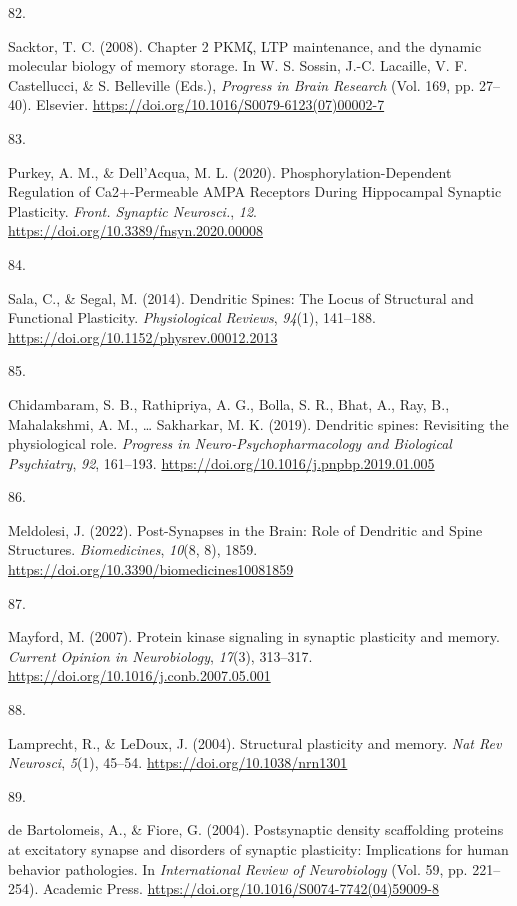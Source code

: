 \documentclass[
  11pt,
  letterpaper,
]{scrreprt}
\newlength{\cslhangindent}
\newlength{\csllabelwidth}
\newenvironment{CSLReferences}[2] %
 {\begin{list}{}{%
  \setlength{\itemindent}{0pt}
  \setlength{\leftmargin}{0pt}
  \setlength{\parsep}{0pt}
  \ifodd #1
   \setlength{\leftmargin}{\cslhangindent}
   \setlength{\itemindent}{-1\cslhangindent}
  \fi
  \setlength{\itemsep}{#2\baselineskip}}}
 {\end{list}}
\newcommand{\CSLLeftMargin}[1]{\parbox[t]{\csllabelwidth}{\strut#1\strut}}
\newcommand{\CSLRightInline}[1]{\parbox[t]{\linewidth - \csllabelwidth}{\strut#1\strut}}
\begin{document}
\begin{CSLReferences}{0}{0}
\CSLLeftMargin{82. }%
\CSLRightInline{Sacktor, T. C. (2008). Chapter 2 {PKMζ}, {LTP}
maintenance, and the dynamic molecular biology of memory storage. In W.
S. Sossin, J.-C. Lacaille, V. F. Castellucci, \& S. Belleville (Eds.),
\emph{Progress in {Brain Research}} (Vol. 169, pp. 27--40). Elsevier.
\url{https://doi.org/10.1016/S0079-6123(07)00002-7}}

\CSLLeftMargin{83. }%
\CSLRightInline{Purkey, A. M., \& Dell'Acqua, M. L. (2020).
Phosphorylation-{Dependent Regulation} of {Ca2}+-{Permeable AMPA
Receptors During Hippocampal Synaptic Plasticity}. \emph{Front. Synaptic
Neurosci.}, \emph{12}. \url{https://doi.org/10.3389/fnsyn.2020.00008}}

\CSLLeftMargin{84. }%
\CSLRightInline{Sala, C., \& Segal, M. (2014). Dendritic {Spines}: {The
Locus} of {Structural} and {Functional Plasticity}. \emph{Physiological
Reviews}, \emph{94}(1), 141--188.
\url{https://doi.org/10.1152/physrev.00012.2013}}

\CSLLeftMargin{85. }%
\CSLRightInline{Chidambaram, S. B., Rathipriya, A. G., Bolla, S. R.,
Bhat, A., Ray, B., Mahalakshmi, A. M., \ldots{} Sakharkar, M. K. (2019).
Dendritic spines: {Revisiting} the physiological role. \emph{Progress in
Neuro-Psychopharmacology and Biological Psychiatry}, \emph{92},
161--193. \url{https://doi.org/10.1016/j.pnpbp.2019.01.005}}

\CSLLeftMargin{86. }%
\CSLRightInline{Meldolesi, J. (2022). Post-{Synapses} in the {Brain}:
{Role} of {Dendritic} and {Spine Structures}. \emph{Biomedicines},
\emph{10}(8, 8), 1859.
\url{https://doi.org/10.3390/biomedicines10081859}}

\CSLLeftMargin{87. }%
\CSLRightInline{Mayford, M. (2007). Protein kinase signaling in synaptic
plasticity and memory. \emph{Current Opinion in Neurobiology},
\emph{17}(3), 313--317.
\url{https://doi.org/10.1016/j.conb.2007.05.001}}

\CSLLeftMargin{88. }%
\CSLRightInline{Lamprecht, R., \& LeDoux, J. (2004). Structural
plasticity and memory. \emph{Nat Rev Neurosci}, \emph{5}(1), 45--54.
\url{https://doi.org/10.1038/nrn1301}}

\CSLLeftMargin{89. }%
\CSLRightInline{de Bartolomeis, A., \& Fiore, G. (2004). Postsynaptic
density scaffolding proteins at excitatory synapse and disorders of
synaptic plasticity: Implications for human behavior pathologies. In
\emph{International {Review} of {Neurobiology}} (Vol. 59, pp. 221--254).
Academic Press. \url{https://doi.org/10.1016/S0074-7742(04)59009-8}}


\end{CSLReferences}
\end{document}

